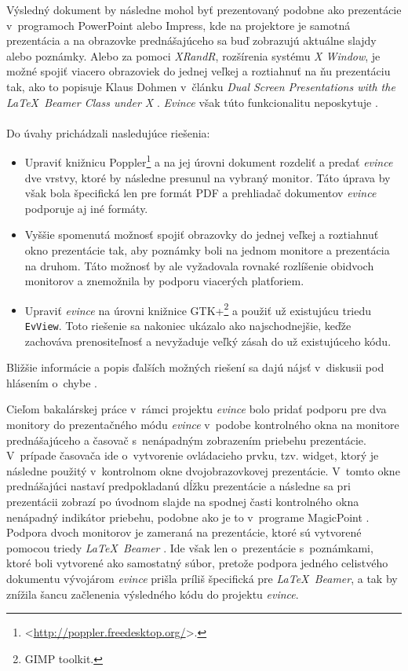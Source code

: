 \documentclass[12pt,oneside,final]{fithesis2}
\begin{document}
Výsledný dokument by následne mohol byť prezentovaný podobne ako prezentácie v~programoch PowerPoint alebo Impress, kde na projektore je samotná prezentácia a na obrazovke prednášajúceho sa buď zobrazujú aktuálne slajdy alebo poznámky. Alebo za pomoci \emph{XRandR}, rozšírenia systému \emph{X Window}, je možné spojiť viacero obrazoviek do jednej veľkej a roztiahnuť na ňu prezentáciu tak, ako to popisuje Klaus Dohmen v~článku \emph{Dual Screen Presentations with the \LaTeX~Beamer Class under X} \cite{dohmen}. \emph{Evince} však túto funkcionalitu neposkytuje \cite{evbug}.
\\
\\
Do úvahy prichádzali nasledujúce riešenia:
\begin{itemize}
\item Upraviť knižnicu Poppler\footnote{<\url{http://poppler.freedesktop.org/}>.} a na jej úrovni dokument rozdeliť a predať \emph{evince} dve vrstvy, ktoré by následne presunul na vybraný monitor. Táto úprava by však bola špecifická len pre formát PDF a prehliadač dokumentov \emph{evince} podporuje aj iné formáty.
\item Vyššie spomenutá možnosť spojiť obrazovky do jednej veľkej a roztiahnuť okno prezentácie tak, aby poznámky boli na jednom monitore a prezentácia na druhom. Táto možnosť by ale vyžadovala rovnaké rozlíšenie obidvoch monitorov a znemožnila by podporu viacerých platforiem.
\item Upraviť \emph{evince} na úrovni knižnice GTK+\footnote{GIMP toolkit.} a použiť už existujúcu triedu \texttt{EvView}. Toto riešenie sa nakoniec ukázalo ako najschodnejšie, keďže zachováva prenositeľnosť a nevyžaduje veľký zásah do už existujúceho kódu.
\end{itemize}

Bližšie informácie a popis ďalších možných riešení sa dajú nájsť v~diskusii pod hlásením o~chybe \cite{evbug}.

Cieľom bakalárskej práce v~rámci projektu \emph{evince} bolo pridať podporu pre dva monitory do prezentačného módu \emph{evince} v~podobe kontrolného okna na monitore prednášajúceho a časovač s~nenápadným zobrazením priebehu prezentácie. V~prípade časovača ide o~vytvorenie ovládacieho prvku, tzv. widget, ktorý je následne použitý v~kontrolnom okne dvojobrazovkovej prezentácie. V~tomto okne prednášajúci nastaví predpokladanú dĺžku prezentácie a následne sa pri prezentácii zobrazí po úvodnom slajde na spodnej časti kontrolného okna nenápadný indikátor priebehu, podobne ako je to v~programe MagicPoint \cite{mgp}. Podpora dvoch monitorov je zameraná na prezentácie, ktoré sú vytvorené pomocou triedy \emph{\LaTeX~Beamer} \cite{beamer}. Ide však len o~prezentácie s~poznámkami, ktoré boli vytvorené ako samostatný súbor, pretože podpora jedného celistvého dokumentu vývojárom \emph{evince} prišla príliš špecifická pre \emph{\LaTeX~Beamer}, a tak by znížila šancu začlenenia výsledného kódu do projektu \emph{evince}.
\end{document}
